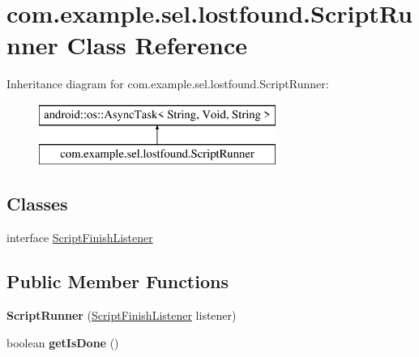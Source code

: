 \hypertarget{classcom_1_1example_1_1sel_1_1lostfound_1_1ScriptRunner}{\section{com.\-example.\-sel.\-lostfound.\-Script\-Runner Class Reference}
\label{classcom_1_1example_1_1sel_1_1lostfound_1_1ScriptRunner}
}
Inheritance diagram for com.\-example.\-sel.\-lostfound.\-Script\-Runner\-:\begin{figure}[H]
\begin{center}
\leavevmode
\includegraphics[height=2.000000cm]{classcom_1_1example_1_1sel_1_1lostfound_1_1ScriptRunner}
\end{center}
\end{figure}
\subsection*{Classes}
\begin{DoxyCompactItemize}
\item 
interface \hyperlink{interfacecom_1_1example_1_1sel_1_1lostfound_1_1ScriptRunner_1_1ScriptFinishListener}{Script\-Finish\-Listener}
\end{DoxyCompactItemize}
\subsection*{Public Member Functions}
\begin{DoxyCompactItemize}
\item 
\hypertarget{classcom_1_1example_1_1sel_1_1lostfound_1_1ScriptRunner_a89fe364ebf708a526d2271b2aaad65dc}{{\bfseries Script\-Runner} (\hyperlink{interfacecom_1_1example_1_1sel_1_1lostfound_1_1ScriptRunner_1_1ScriptFinishListener}{Script\-Finish\-Listener} listener)}\label{classcom_1_1example_1_1sel_1_1lostfound_1_1ScriptRunner_a89fe364ebf708a526d2271b2aaad65dc}

\item 
\hypertarget{classcom_1_1example_1_1sel_1_1lostfound_1_1ScriptRunner_a9f6500f6f9fda5c4230dbbba9724b8bd}{boolean {\bfseries get\-Is\-Done} ()}\label{classcom_1_1example_1_1sel_1_1lostfound_1_1ScriptRunner_a9f6500f6f9fda5c4230dbbba9724b8bd}

\end{DoxyCompactItemize}
